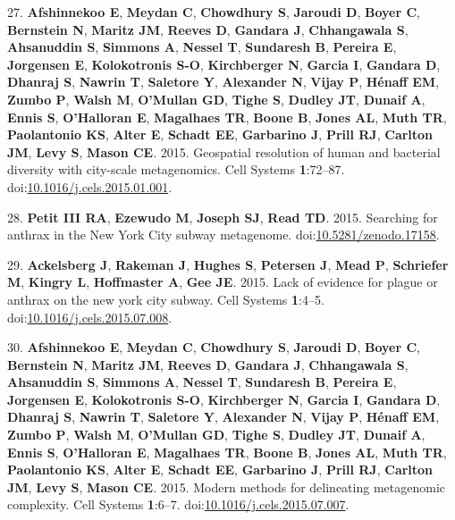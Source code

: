 \documentclass[11,]{article}
\begin{document}
27. \textbf{Afshinnekoo E}, \textbf{Meydan C}, \textbf{Chowdhury S},
\textbf{Jaroudi D}, \textbf{Boyer C}, \textbf{Bernstein N},
\textbf{Maritz JM}, \textbf{Reeves D}, \textbf{Gandara J},
\textbf{Chhangawala S}, \textbf{Ahsanuddin S}, \textbf{Simmons A},
\textbf{Nessel T}, \textbf{Sundaresh B}, \textbf{Pereira E},
\textbf{Jorgensen E}, \textbf{Kolokotronis S-O}, \textbf{Kirchberger N},
\textbf{Garcia I}, \textbf{Gandara D}, \textbf{Dhanraj S},
\textbf{Nawrin T}, \textbf{Saletore Y}, \textbf{Alexander N},
\textbf{Vijay P}, \textbf{H{é}naff EM}, \textbf{Zumbo P}, \textbf{Walsh
M}, \textbf{O'Mullan GD}, \textbf{Tighe S}, \textbf{Dudley JT},
\textbf{Dunaif A}, \textbf{Ennis S}, \textbf{O'Halloran E},
\textbf{Magalhaes TR}, \textbf{Boone B}, \textbf{Jones AL}, \textbf{Muth
TR}, \textbf{Paolantonio KS}, \textbf{Alter E}, \textbf{Schadt EE},
\textbf{Garbarino J}, \textbf{Prill RJ}, \textbf{Carlton JM},
\textbf{Levy S}, \textbf{Mason CE}. 2015. Geospatial resolution of human
and bacterial diversity with city-scale metagenomics. Cell Systems
\textbf{1}:72--87.
doi:\href{http://dx.doi.org/10.1016/j.cels.2015.01.001}{10.1016/j.cels.2015.01.001}.

28. \textbf{Petit III RA}, \textbf{Ezewudo M}, \textbf{Joseph SJ},
\textbf{Read TD}. 2015. Searching for anthrax in the New York City
subway metagenome.
doi:\href{http://dx.doi.org/10.5281/zenodo.17158}{10.5281/zenodo.17158}.

29. \textbf{Ackelsberg J}, \textbf{Rakeman J}, \textbf{Hughes S},
\textbf{Petersen J}, \textbf{Mead P}, \textbf{Schriefer M},
\textbf{Kingry L}, \textbf{Hoffmaster A}, \textbf{Gee JE}. 2015. Lack of
evidence for plague or anthrax on the new york city subway. Cell Systems
\textbf{1}:4--5.
doi:\href{http://dx.doi.org/10.1016/j.cels.2015.07.008}{10.1016/j.cels.2015.07.008}.

30. \textbf{Afshinnekoo E}, \textbf{Meydan C}, \textbf{Chowdhury S},
\textbf{Jaroudi D}, \textbf{Boyer C}, \textbf{Bernstein N},
\textbf{Maritz JM}, \textbf{Reeves D}, \textbf{Gandara J},
\textbf{Chhangawala S}, \textbf{Ahsanuddin S}, \textbf{Simmons A},
\textbf{Nessel T}, \textbf{Sundaresh B}, \textbf{Pereira E},
\textbf{Jorgensen E}, \textbf{Kolokotronis S-O}, \textbf{Kirchberger N},
\textbf{Garcia I}, \textbf{Gandara D}, \textbf{Dhanraj S},
\textbf{Nawrin T}, \textbf{Saletore Y}, \textbf{Alexander N},
\textbf{Vijay P}, \textbf{H{é}naff EM}, \textbf{Zumbo P}, \textbf{Walsh
M}, \textbf{O'Mullan GD}, \textbf{Tighe S}, \textbf{Dudley JT},
\textbf{Dunaif A}, \textbf{Ennis S}, \textbf{O'Halloran E},
\textbf{Magalhaes TR}, \textbf{Boone B}, \textbf{Jones AL}, \textbf{Muth
TR}, \textbf{Paolantonio KS}, \textbf{Alter E}, \textbf{Schadt EE},
\textbf{Garbarino J}, \textbf{Prill RJ}, \textbf{Carlton JM},
\textbf{Levy S}, \textbf{Mason CE}. 2015. Modern methods for delineating
metagenomic complexity. Cell Systems \textbf{1}:6--7.
doi:\href{http://dx.doi.org/10.1016/j.cels.2015.07.007}{10.1016/j.cels.2015.07.007}.
\end{document}
